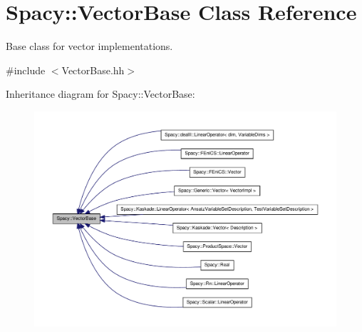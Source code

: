 \hypertarget{classSpacy_1_1VectorBase}{\section{\-Spacy\-:\-:\-Vector\-Base \-Class \-Reference}
\label{classSpacy_1_1VectorBase}
}


\-Base class for vector implementations.  




{\ttfamily \#include $<$\-Vector\-Base.\-hh$>$}



\-Inheritance diagram for \-Spacy\-:\-:\-Vector\-Base\-:
\nopagebreak
\begin{figure}[H]
\begin{center}
\leavevmode
\includegraphics[width=350pt]{classSpacy_1_1VectorBase__inherit__graph}
\end{center}
\end{figure}
